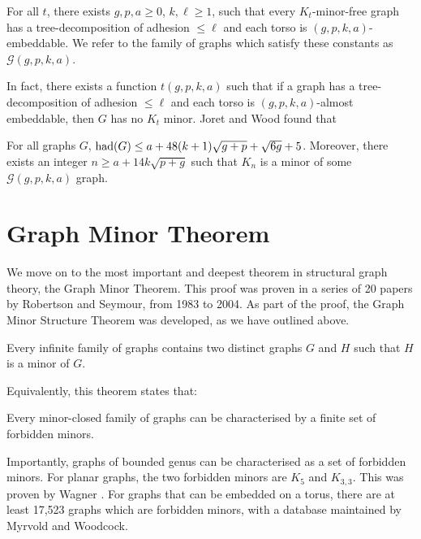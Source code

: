 \begin{theorem}
	For all \(t\), there exists \(g, p, a \geq 0\), \(k, \ell \geq 1\), such that every \(K_t\)-minor-free graph has a tree-decomposition of adhesion \(\leq \ell\) and each torso is \((g, p, k, a)\)-embeddable. We refer to the family of graphs which satisfy these constants as \(\mathcal{G}(g, p, k, a)\). 
\end{theorem}
In fact, there exists a function \(t(g, p, k, a)\) such that if a graph has a tree-decomposition of adhesion \(\leq \ell\) and each torso is \((g, p, k, a)\)-almost embeddable, then \(G\) has no \(K_t\) minor. Joret and Wood\cite{joretCompleteGraphMinors2013} found that
\begin{theorem}\label{thm:graph_structure_bound_theorem}
	For all graphs \(G\),
	\(\text{had}(G) \leq a + 48(k + 1)\sqrt{g + p} + \sqrt{6g} + 5\). Moreover, there exists an integer \(n \geq a + 1 4 k\sqrt{p + g}\) such that \(K_n\) is a minor of some \(\mathcal{G}(g, p, k, a)\) graph.
\end{theorem}

\section{Graph Minor Theorem}\label{sec:Graph Minor Theorem}
We move on to the most important and deepest theorem in structural graph theory, the Graph Minor Theorem. This proof was proven in a series of 20 papers by Robertson and Seymour, from 1983 to 2004. As part of the proof, the Graph Minor Structure Theorem was developed, as we have outlined above. 
\begin{theorem}
	Every infinite family of graphs contains two distinct graphs \(G\) and \(H\) such that \(H\) is a minor of \(G\).
\end{theorem}
Equivalently, this theorem states that:
\begin{theorem}
	Every minor-closed family of graphs can be characterised by a finite set of forbidden minors.
\end{theorem}
Importantly, graphs of bounded genus can be characterised as a set of forbidden minors.
For planar graphs, the two forbidden minors are \(K_5\) and \(K_{3,3}\). This was proven by Wagner \cite{wagnerUeberEigenschaftEbenen1937}. 
For graphs that can be embedded on a torus, there are at least 17,523 graphs which are forbidden minors, with a database maintained by Myrvold and Woodcock\cite{myrvoldLargeSetTorus2018}. 
